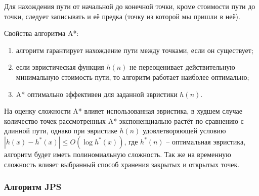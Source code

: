 Для нахождения пути от начальной до конечной точки, кроме стоимости пути до точки, следует записывать и её предка (точку из которой мы пришли в неё).


Свойства алгоритма A*:

\begin{enumerate}
    \item алгоритм гарантирует нахождение пути между точками, если он существует;
    \item если эвристическая функция $h(n)$ не переоценивает действительную минимальную стоимость пути, то алгоритм работает наиболее оптимально;
    \item A* оптимально эффективен для заданной эвристики $h(n)$.
\end{enumerate}

На оценку сложности A* влияет использованная эвристика, в худшем случае количество точек рассмотренных A* экспоненциально растёт по сравнению с длинной пути, однако при эвристике $h(n)$ удовлетворяющей условию $|h(x) - h^*(x)| \leq O(\log h^*(x))$, где $h^*(n)$ -- оптимальная эвристика, алгоритм будет иметь полиномиальную сложность. Так же на временную сложность влияет выбранный способ хранения закрытых и открытых точек.

\subsubsection{Алгоритм JPS}

